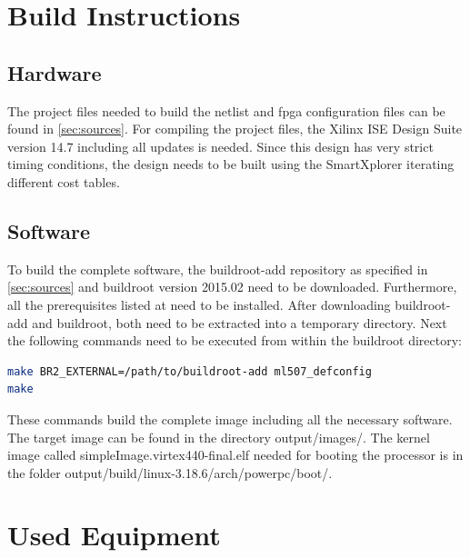 \documentclass[12pt,a4paper,parskip=full,abstract=true,BCOR=12mm]{scrreprt}
\begin{document}
\chapter{Build Instructions}
\section{Hardware}
\label{sec:build:hw}

The project files needed to build the netlist and \gls{fpga} configuration files can be found
in \cref{sec:sources}. For compiling the project files, the
Xilinx ISE Design Suite version 14.7 including all updates is needed. Since
this design has very strict timing conditions, the design needs to be built
using the SmartXplorer iterating different cost tables.

\section{Software}
\label{sec:build:sw}

To build the complete software, the buildroot-add repository as specified in
\cref{sec:sources} and buildroot version 2015.02 \cite{buildroot} need to be downloaded. Furthermore,
all the prerequisites listed at \cite{buildroot} need to be installed. After
downloading buildroot-add and buildroot, both need to be extracted into a temporary directory. Next
the following commands need to be executed from within the buildroot directory:

\begin{lstlisting}[language=sh]
make BR2_EXTERNAL=/path/to/buildroot-add ml507_defconfig
make
\end{lstlisting}

These commands build the complete image including all the necessary software. The target image
can be found in the directory {\ttfamily output/images/}. The kernel image called {\ttfamily simpleImage.virtex440-final.elf} needed for booting
the processor is in the folder {\ttfamily output/build/linux-3.18.6/arch/powerpc/boot/}.

\chapter{Used Equipment}
\label{sec:instruments}
\end{document}
